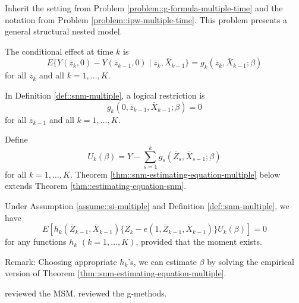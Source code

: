 \begin{HomeworkProblem}\label{exr:29-10}


Inherit the setting from Problem \ref{problem::g-formula-multiple-time} and the notation from Problem \ref{problem::ipw-multiple-time}. This problem presents a general structural nested model.

\begin{definition}
\label{def::snm-multiple}
The conditional effect at time $k$ is
\[
E\{  Y(\overline{z}_k,0) - Y( \overline{z}_{k-1},0) \mid \overline{z}_k , \overline{X}_{k-1} \} = g_k( \overline{z}_k, \overline{X}_{k-1}; \beta)
\]
for all $\overline{z}_k$ and all $k=1,\ldots, K$.
\end{definition}



In Definition \ref{def::snm-multiple},  a logical restriction is
\[
g_k(0,  \overline{z}_{k-1}, \overline{X}_{k-1}; \beta)    = 0
\]
for all $\overline{z}_{k-1}$ and all $k=1,\ldots, K$.


Define
\[
U_k(\beta) = Y - \sum_{s=1}^k  g_s( \overline{Z}_s, \overline{X}_{s-1}; \beta)
\]
for all $k=1,\ldots, K$. Theorem  \ref{thm::snm-estimating-equation-multiple} below extends Theorem \ref{thm::estimating-equation-snm}.



\begin{Theorem}
\label{thm::snm-estimating-equation-multiple}
Under Assumption \ref{assume::si-multiple} and Definition \ref{def::snm-multiple},  we have
\[
E\left[    h_k( \overline{Z}_{k-1}, \overline{X}_{k-1} ) \{  Z_k - e(1, \overline{Z}_{k-1}, \overline{X}_{k-1}) \}  U_k(\beta)
\right] = 0
\]
for any functions $h_k$ $(k=1,\ldots, K)$, provided that   the moment exists.
\end{Theorem}



Remark: Choosing appropriate $h_k$'s, we can estimate $\beta$ by solving the empirical version of Theorem \ref{thm::snm-estimating-equation-multiple}.



\end{HomeworkProblem}

\begin{HomeworkProblem}\label{exr:29-11}

\citet{robins2000marginal} reviewed the MSM. \citet{naimi2017introduction} reviewed the g-methods.

\end{HomeworkProblem}
